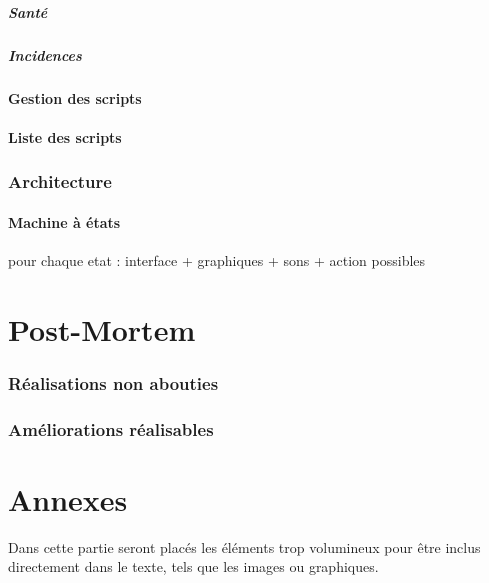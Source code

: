 \documentclass[a4paper]{article}
\newcommand{\alinea}{\hspace*{0.5cm}}
\begin{document}
			\subsubsection{Santé}
			
			\subsubsection{Incidences}
			
		\subsection{Gestion des scripts}
		
		\subsection{Liste des scripts}
		
	\section{Architecture}
	
		\subsection{Machine à états}
			pour chaque etat :
			interface + graphiques + sons + action possibles
	

  \newpage
  \part{Post-Mortem}
  
	\section{Réalisations non abouties}
	
	\section{Améliorations réalisables}
	

  \newpage
  \part{Annexes}
    \alinea Dans cette partie seront placés les éléments trop volumineux pour être inclus directement dans le texte, tels que les images ou graphiques.\\
    
\end{document}
